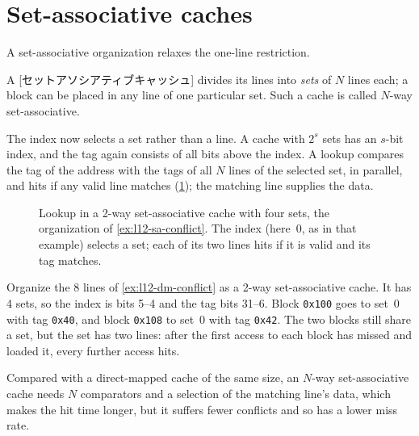 \documentclass[../main.tex]{subfiles}
\begin{document}
\section{Set-associative caches}
\label{sec:l12-sa}

A set-associative organization relaxes the one-line
restriction.

\begin{definition}
  A [セットアソシアティブキャッシュ] divides its
  lines into \emph{sets} of $N$ lines each; a block can be placed in any
  line of one particular set.  Such a cache is called $N$-way
  set-associative.
\end{definition}

The index now selects a set rather than a line.  A cache with $2^{s}$ sets
has an $s$-bit index, and the tag again consists of all bits above the
index.  A lookup compares the tag of the address with the tags of all $N$
lines of the selected set, in parallel, and hits if any valid line matches
(\cref{fig:l12-set-associative}); the matching line supplies the data.

\begin{figure}[htbp]
  \centering
  
  \caption{Lookup in a 2-way set-associative cache with four sets, the
    organization of \cref{ex:l12-sa-conflict}.  The index (here~0, as in
    that example) selects a set; each of its two lines hits if it is valid
    and its tag matches.}
  \label{fig:l12-set-associative}
\end{figure}

\begin{example}
  \label{ex:l12-sa-conflict}
  Organize the 8 lines of \cref{ex:l12-dm-conflict} as a 2-way
  set-associative cache.  It has 4 sets, so the index is bits 5--4 and the
  tag bits 31--6.  Block \texttt{0x100} goes to set~0 with tag
  \texttt{0x40}, and block \texttt{0x108} to set~0 with tag \texttt{0x42}.
  The two blocks still share a set, but the set has two lines: after the
  first access to each block has missed and loaded it, every further access
  hits.
\end{example}

Compared with a direct-mapped cache of the same size, an $N$-way
set-associative cache needs $N$ comparators and a selection of the matching
line's data, which makes the hit time longer, but it suffers fewer conflicts
and so has a lower miss rate.
\end{document}
